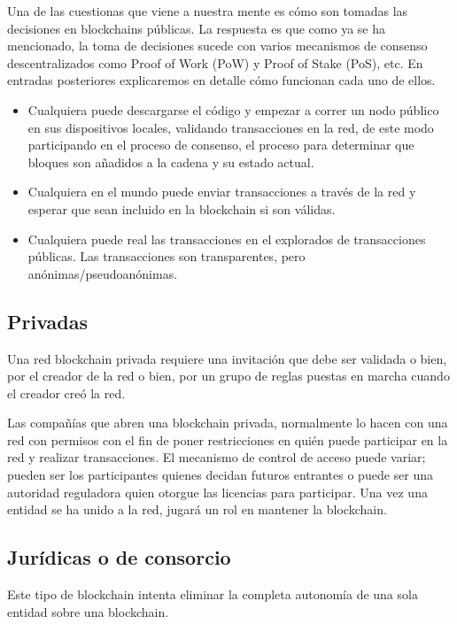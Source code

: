 \documentclass[conference]{IEEEtran}
\begin{document}
Una de las cuestionas que viene a nuestra mente es cómo son tomadas las decisiones en blockchains públicas. La respuesta es que como ya se ha mencionado, la toma de decisiones sucede con varios mecanismos de consenso descentralizados como Proof of Work (PoW) y Proof of Stake (PoS), etc. En entradas posteriores explicaremos en detalle cómo funcionan cada uno de ellos.

\begin{itemize}
    \item Cualquiera puede descargarse el código y empezar a correr un nodo público en sus dispositivos locales, validando transacciones en la red, de este modo participando en el proceso de consenso, el proceso para determinar que bloques son añadidos a la cadena y su estado actual.
    \item Cualquiera en el mundo puede enviar transacciones a través de la red y esperar que sean incluido en la blockchain si son válidas.
    \item Cualquiera puede real las transacciones en el explorados de transacciones públicas. Las transacciones son transparentes, pero anónimas/pseudoanónimas.
\end{itemize}

\subsection{Privadas}

Una red blockchain privada requiere una invitación que debe ser validada o bien, por el creador de la red o bien, por un grupo de reglas puestas en marcha cuando el creador creó la red.

Las compañías que abren una blockchain privada, normalmente lo hacen con una red con permisos con el fin de poner restricciones en quién puede participar en la red y realizar transacciones. El mecanismo de control de acceso puede variar; pueden ser los participantes quienes decidan futuros entrantes o puede ser una autoridad reguladora quien otorgue las licencias para participar. Una vez una entidad se ha unido a la red, jugará un rol en mantener la blockchain.



\subsection{Jurídicas o de consorcio}

Este tipo de blockchain intenta eliminar la completa autonomía de una sola entidad sobre una blockchain.
\end{document}
